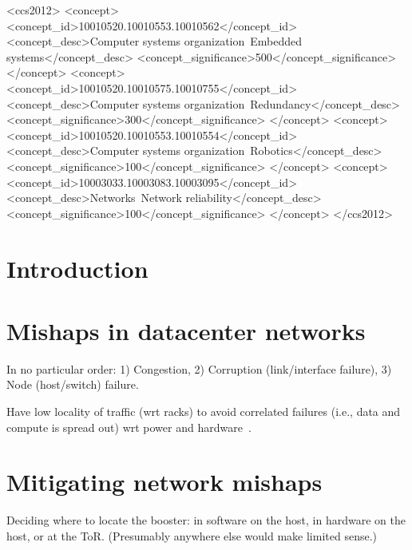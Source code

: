 \documentclass[sigconf]{acmart}
\begin{document}
%
%
\begin{CCSXML}
<ccs2012>
 <concept>
  <concept_id>10010520.10010553.10010562</concept_id>
  <concept_desc>Computer systems organization~Embedded systems</concept_desc>
  <concept_significance>500</concept_significance>
 </concept>
 <concept>
  <concept_id>10010520.10010575.10010755</concept_id>
  <concept_desc>Computer systems organization~Redundancy</concept_desc>
  <concept_significance>300</concept_significance>
 </concept>
 <concept>
  <concept_id>10010520.10010553.10010554</concept_id>
  <concept_desc>Computer systems organization~Robotics</concept_desc>
  <concept_significance>100</concept_significance>
 </concept>
 <concept>
  <concept_id>10003033.10003083.10003095</concept_id>
  <concept_desc>Networks~Network reliability</concept_desc>
  <concept_significance>100</concept_significance>
 </concept>
</ccs2012>  
\end{CCSXML}





\maketitle

\section{Introduction}

\section{Mishaps in datacenter networks}
In no particular order:
1) Congestion,
2) Corruption (link/interface failure),
3) Node (host/switch) failure.

Have low locality of traffic (wrt racks) to avoid correlated failures (i.e., data and compute is spread out) wrt power and hardware~\cite{jupiter}.


\section{Mitigating network mishaps}
Deciding where to locate the booster:
in software on the host,
in hardware on the host,
or at the ToR.
(Presumably anywhere else would make limited sense.)
\end{document}

